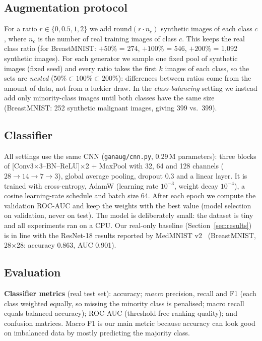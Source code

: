 \subsection{Augmentation protocol}
\label{sec:aug}
For a ratio $r\in\{0, 0.5, 1, 2\}$ we add $\mathrm{round}(r\cdot n_c)$ synthetic images of each class $c$, where $n_c$ is
the number of real training images of class $c$. This keeps the real class ratio (for BreastMNIST: $+50\%$ = 274,
$+100\%$ = 546, $+200\%$ = 1{,}092 synthetic images). For each generator we sample one fixed pool of synthetic images
(fixed seed) and every ratio takes the first $k$ images of each class, so the sets are \emph{nested}
($50\% \subset 100\% \subset 200\%$): differences between ratios come from the amount of data, not from a luckier draw.
In the \emph{class-balancing} setting we instead add only minority-class images until both classes have the same size
(BreastMNIST: 252 synthetic malignant images, giving 399 vs.\ 399).

\subsection{Classifier}
All settings use the same CNN (\texttt{ganaug/cnn.py}, 0.29\,M parameters): three blocks of
[Conv3$\times$3--BN--ReLU]$\times$2 + MaxPool with 32, 64 and 128 channels ($28\to14\to7\to3$), global average pooling,
dropout 0.3 and a linear layer. It is trained with cross-entropy, AdamW (learning rate $10^{-3}$, weight decay $10^{-4}$),
a cosine learning-rate schedule and batch size 64. After each epoch we compute the validation ROC-AUC and keep the weights
with the best value (model selection on validation, never on test). The model is deliberately small: the dataset is tiny
and all experiments ran on a CPU. Our real-only baseline (Section~\ref{sec:results}) is in line with the ResNet-18 results
reported by MedMNIST v2~\cite{yang2023medmnist} (BreastMNIST, 28$\times$28: accuracy 0.863, AUC 0.901).

\subsection{Evaluation}
\textbf{Classifier metrics} (real test set): accuracy; \emph{macro} precision, recall and F1 (each class weighted
equally, so missing the minority class is penalised; macro recall equals balanced accuracy); ROC-AUC (threshold-free
ranking quality); and confusion matrices. Macro F1 is our main metric because accuracy can look good on imbalanced data
by mostly predicting the majority class.

